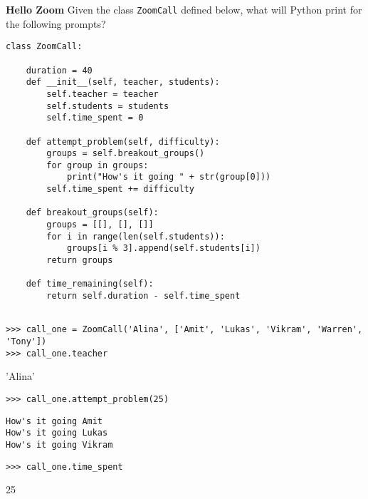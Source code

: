 \begin{blocksection}
\question \textbf{Hello Zoom} \newline
Given the class \lstinline{ZoomCall} defined below, what will Python print for the following prompts? 

\begin{lstlisting}
class ZoomCall:

    duration = 40
    def __init__(self, teacher, students):
        self.teacher = teacher
        self.students = students
        self.time_spent = 0

    def attempt_problem(self, difficulty):
        groups = self.breakout_groups()
        for group in groups:
            print("How's it going " + str(group[0]))
        self.time_spent += difficulty

    def breakout_groups(self):
        groups = [[], [], []]
        for i in range(len(self.students)):
            groups[i % 3].append(self.students[i])
        return groups

    def time_remaining(self):
        return self.duration - self.time_spent
       
\end{lstlisting}
\end{blocksection}
\newline
\newline
\newline
\begin{blocksection}

\begin{lstlisting}
>>> call_one = ZoomCall('Alina', ['Amit', 'Lukas', 'Vikram', 'Warren', 'Tony'])
>>> call_one.teacher
\end{lstlisting}
\begin{solution}[.2in]
'Alina'
\end{solution}

\begin{lstlisting}
>>> call_one.attempt_problem(25)
\end{lstlisting}
\begin{solution}[.2in]
\begin{lstlisting}
How's it going Amit
How's it going Lukas
How's it going Vikram
\end{lstlisting}
\end{solution}

\begin{lstlisting}
>>> call_one.time_spent
\end{lstlisting}
\begin{solution}[.2in]
25
\end{solution}
\end{blocksection}

